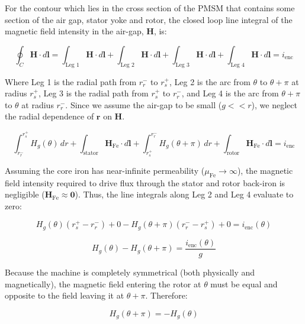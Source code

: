 \documentclass{article}
\begin{document}
For the contour which lies in the cross section of the PMSM that contains some section of the air gap, stator yoke and rotor, the closed loop line integral of the magnetic field intensity in the air-gap, $\textbf{H}$, is:

\begin{equation}
    \oint_C \mathbf{H} \cdot d\mathbf{l} = \int_{\text{Leg 1}} \mathbf{H} \cdot d\mathbf{l} + \int_{\text{Leg 2}} \mathbf{H} \cdot d\mathbf{l} + \int_{\text{Leg 3}} \mathbf{H} \cdot d\mathbf{l} + \int_{\text{Leg 4}} \mathbf{H} \cdot d\mathbf{l} = i_{\text{enc}}
\end{equation}

Where Leg 1 is the radial path from $r_r^-$ to $r_s^+$, Leg 2 is the arc from $\theta$ to $\theta + \pi$ at radius $r_s^+$, Leg 3 is the radial path from $r_s^+$ to $r_r^-$, and Leg 4 is the arc from $\theta + \pi$ to $\theta$ at radius $r_r^-$. Since we assume the air-gap to be small ($g << r$), we neglect the radial dependence of $\mathbf{r}$ on $\mathbf{H}$. 

\begin{equation}
    \int_{r_r^-}^{r_s^+} H_g(\theta) \, dr + \int_{\text{stator}} \mathbf{H}_{\text{Fe}} \cdot d\mathbf{l} + \int_{r_s^+}^{r_r^-} H_g(\theta + \pi) \, dr + \int_{\text{rotor}} \mathbf{H}_{\text{Fe}} \cdot d\mathbf{l} = i_{\text{enc}}
\end{equation}

Assuming the core iron has near-infinite permeability ($\mu_{\text{Fe}} \to \infty$), the magnetic field intensity required to drive flux through the stator and rotor back-iron is negligible ($\mathbf{H}_{\text{Fe}} \approx \mathbf{0}$). Thus, the line integrals along Leg 2 and Leg 4 evaluate to zero:

\begin{equation}
    H_g(\theta)(r_s^+ - r_r^-) + 0 - H_g(\theta + \pi)(r_r^- - r_s^+) + 0 = i_{\text{enc}}(\theta)
\end{equation}

\begin{equation}
\label{eqn10}
    H_g(\theta) - H_g(\theta + \pi) = \frac{i_{\text{enc}}(\theta)}{g}
\end{equation}

Because the machine is completely symmetrical (both physically and magnetically), the magnetic field entering the rotor at $\theta$ must be equal and opposite to the field leaving it at $\theta + \pi$. Therefore:

\begin{equation}
    H_g(\theta + \pi) = -H_g(\theta)    
\end{equation}
\end{document}
